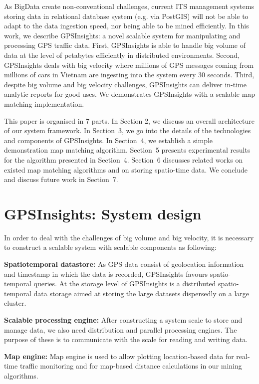 \documentclass{acm_proc_article-sp}
\begin{document}
As BigData create non-conventional challenges, current ITS management systems storing data in relational database system (e.g. via PostGIS) will not be able to adapt to the data ingestion speed, nor being able to be mined efficiently. In this work, we describe GPSInsights: a novel scalable system for manipulating and processing GPS traffic data. First, GPSInsights is able to handle big volume of data at the level of petabytes efficiently in distributed environments. Second, GPSInsights deals with big velocity where millions of GPS messages coming from millions of cars in Vietnam are ingesting into the system every 30 seconds. Third, despite big volume and big velocity challenges, GPSInsights can deliver in-time analytic reports for good uses. We demonstrates GPSInsights with a scalable map matching implementation. 

This paper is organised in 7 parts. In Section 2, we discuss an overall architecture of our system framework. In Section~3, we go into the details of the technologies and components of GPSInsights. In Section~4, we establish a simple demonstration map matching algorithm. Section~5 presents experimental results for the algorithm presented in Section~4. Section~6 discusses related works on existed map matching algorithms and on storing spatio-time data. We conclude and discuss future work in Section~7.
	
\section{GPSInsights: System design} 
	
In order to deal with the challenges of big volume and big velocity, it is necessary to construct a scalable system with scalable components as following:

\textbf{Spatiotemporal datastore:} As GPS data consist of geolocation information and timestamp in which the data is recorded, GPSInsights favours spatio-temporal queries. At the storage level of GPSInsights is a distributed spatio-temporal data storage aimed at storing the large datasets dispersedly on a large cluster. 

\textbf{Scalable processing engine:} After constructing a system scale to store and manage data, we also need distribution and parallel processing engines. The purpose of these is to communicate with the scale for reading and writing data.

\textbf{Map engine:} Map engine is used to allow plotting location-based data for real-time traffic monitoring and for map-based distance calculations in our mining algorithms. 
\end{document}
